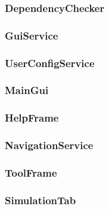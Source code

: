 \documentclass[a4paper, 11pt]{article} %
\begin{document}

\subsubsection{DependencyChecker}
\label{sssub:dependencychecker}


\subsubsection{GuiService}
\label{sssub:guiservice}


\subsubsection{UserConfigService} %
\label{ssub:userconfigservice}


\subsubsection{MainGui} %
\label{ssub:maingui}


\subsubsection{HelpFrame} %
\label{ssub:helpframe}


\subsubsection{NavigationService} %
\label{ssub:navigationservice}


\subsubsection{ToolFrame} %
\label{ssub:toolframe}


\subsubsection{SimulationTab} %
\label{ssub:simulationtab}
\end{document}
